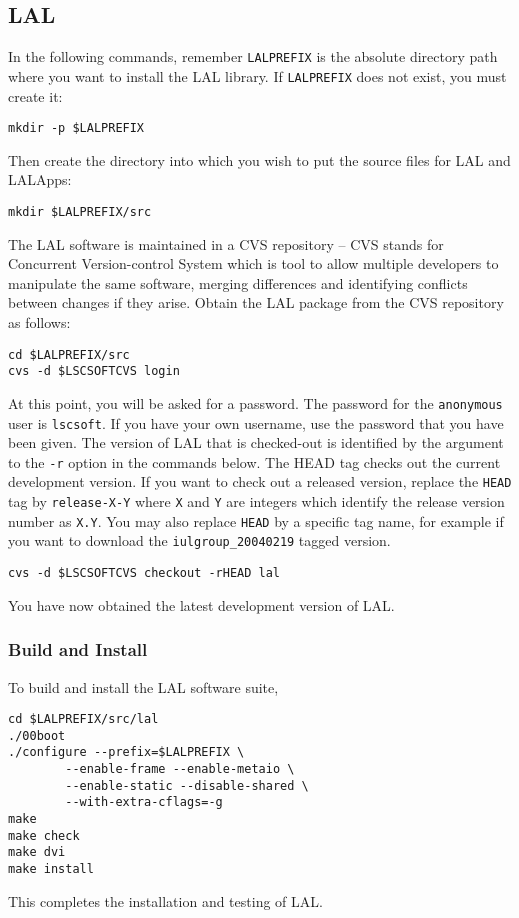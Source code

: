\subsection{LAL}\label{ss:lal}
\color{black}

In the following commands, remember \verb+LALPREFIX+ is the
absolute directory path where you want to install the LAL library.  If
\verb+LALPREFIX+ does not exist,  you must create it:
\begin{verbatim}
mkdir -p $LALPREFIX
\end{verbatim}
Then create the directory into which you wish to put the source files for LAL
and LALApps:
\begin{verbatim}
mkdir $LALPREFIX/src
\end{verbatim}

The LAL software is maintained in a CVS repository -- CVS stands for
Concurrent Version-control System which is tool to allow multiple developers
to manipulate the same software,  merging differences and identifying
conflicts between changes if they arise.  Obtain the LAL package from the CVS
repository as follows:  
\begin{verbatim}
cd $LALPREFIX/src
cvs -d $LSCSOFTCVS login
\end{verbatim}
At this point,  you will be asked for a password.  The password for the
\verb+anonymous+ user is \verb+lscsoft+. If you have your own username, use the
password that you have been given.
The version of LAL that is checked-out is identified by the argument
to the \texttt{-r} option in the commands below.   The HEAD tag checks out the
current development version.  If you want to check out a released
version, replace the \verb+HEAD+ tag by \verb+release-X-Y+ where
\verb+X+ and \verb+Y+ are integers which identify the release version
number as \verb+X.Y+. You may also replace \verb+HEAD+ by a specific tag name,
for example if you want to download the \verb+iulgroup_20040219+ tagged
version.
\begin{verbatim}
cvs -d $LSCSOFTCVS checkout -rHEAD lal
\end{verbatim}
You have now obtained the latest development version of LAL.

\subsubsection{Build and Install}
To build and install the LAL software suite, 
\begin{verbatim}
cd $LALPREFIX/src/lal
./00boot
./configure --prefix=$LALPREFIX \
        --enable-frame --enable-metaio \
        --enable-static --disable-shared \
        --with-extra-cflags=-g
make
make check
make dvi
make install
\end{verbatim}
This completes the installation and testing of LAL.  

